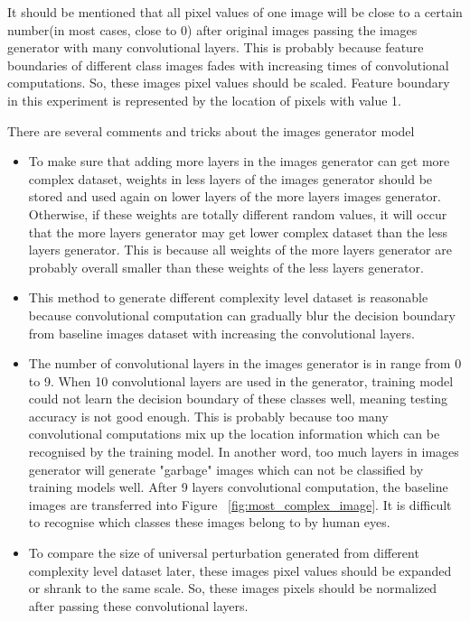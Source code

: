 \documentclass{article}
\begin{document}
It should be mentioned that all pixel values of one image will be close to a certain number(in most cases, close to 0) after original images passing the images generator with many convolutional layers. This is probably because feature boundaries of different class images fades with increasing times of convolutional computations. So, these images pixel values should be scaled. Feature boundary in this experiment is represented by the location of pixels with value 1.

There are several comments and tricks about the images generator model
\begin{itemize}
    
    \item To make sure that adding more layers in the images generator can get more complex dataset, weights in less layers of the images generator should be stored and used again on lower layers of the more layers images generator. Otherwise, if these weights are totally different random values, it will occur that the more layers generator may get lower complex dataset than the less layers generator. This is because all weights of the more layers generator are probably overall smaller than these weights of the less layers generator.
    
    \item This method to generate different complexity level dataset is reasonable because convolutional computation can gradually blur the decision boundary from baseline images dataset with increasing the convolutional layers.
    
    \item The number of convolutional layers in the images generator is in range from 0 to 9. When 10 convolutional layers are used in the generator, training model could not learn the decision boundary of these classes well, meaning testing accuracy is not good enough. This is probably because too many convolutional computations mix up the location information which can be recognised by the training model. In another word, too much layers in images generator will generate "garbage" images which can not be classified by training models well. After 9 layers convolutional computation, the baseline images are transferred into Figure~ \ref{fig:most_complex_image}. It is difficult to recognise which classes these images belong to by human eyes.
    
    \item To compare the size of universal perturbation generated from different complexity level dataset later, these images pixel values should be expanded or shrank to the same scale. So, these images pixels should be normalized after passing these convolutional layers.
    

\end{itemize}
\end{document}
